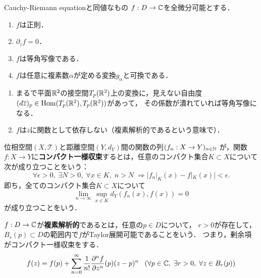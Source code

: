 \documentclass[uplatex, dvipdfmx]{jsreport}
\begin{document}
\begin{itembox}[l]{Cauchy-Riemann equationと同値なもの}
    $f:D\to\mathbb{C}$を全微分可能とする．
    \begin{enumerate}
        \item $f$は正則．
        \item $\partial_{\overline{z}}f=0$．
        \item $f$は等角写像である．
        \item $f$は任意に複素数$\alpha$が定める変換$g_\alpha$と可換である．
    \end{enumerate}
\end{itembox}

\begin{remark}[正則とは？]\mbox{}
    \begin{enumerate}
        \item まるで平面$\mathbb{R}^2$の接空間$T_p(\mathbb{R}^2)$上の変換に，見えない自由度$(d\overline{z})_p\in\mathrm{Hom}(T_p(\mathbb{R}^2),T_p(\mathbb{R}^2))$があって，
        その係数が潰れていれば等角写像になる．
        \item $f$は$\overline{z}$に関数として依存しない（複素解析的であるという意味で）．
    \end{enumerate}
\end{remark}

\begin{definition}
    位相空間$(X,\mathcal{T})$と距離空間$(Y,d_Y)$間の関数の列$(f_n:X\to Y)_{n\in\mathbb{N}}$
    が，関数$f:X\to Y$に\textbf{コンパクト一様収束}するとは，任意のコンパクト集合$K\subset X$について次が成り立つことをいう：
    \[ \forall\epsilon>0,\;\exists N>0,\;\forall x\in K,\;n>N\;\Rightarrow |f_n|_K(x)-f|_K(x)|<\epsilon.  \]
    即ち，全てのコンパクト集合$K\subset X$について
    \[\lim_{n\to\infty}\sup_{x\in K}d_Y(f_n(x),f(x))=0 \]
    が成り立つことをいう．
\end{definition}

\begin{definition}[analytic]
    $f:D\to\mathbb{C}$が\textbf{複素解析的}であるとは，任意の$p\in D$について，
    $r>0$が存在して，$B_r(p)\subset D$の範囲内で$f$がTaylor展開可能であることをいう．
    つまり，剰余項がコンパクト一様収束をする．
    \[ f(z) = f(p) + \sum^{\infty}_{n=0}\frac{1}{n!}\frac{\partial^nf}{\partial z^n}(p)(z-p)^n\;\;\;(\forall p\in\mathbb{C},\;\exists r>0,\;\forall z\in B_r(p)) \]
\end{definition}
\end{document}
